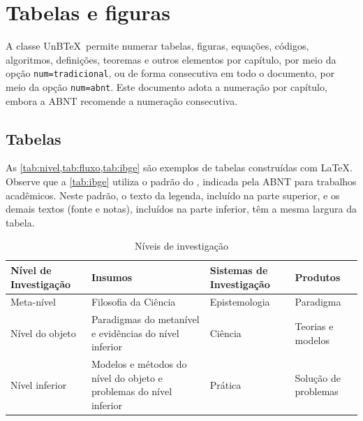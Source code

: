 \chapter{Tabelas e figuras}
\label{cap:tabfig}

A classe UnB\TeX\ permite numerar tabelas, figuras, equações, códigos, algoritmos, definições, teoremas e outros elementos por capítulo, por meio da opção \texttt{num=tradicional}, ou de forma consecutiva em todo o documento, por meio da opção \texttt{num=abnt}. Este documento adota a numeração por capítulo, embora a ABNT recomende a numeração consecutiva.

\section{Tabelas}

As \cref{tab:nivel,tab:fluxo,tab:ibge} são exemplos de tabelas construídas com \LaTeX. Observe que a \cref{tab:ibge} utiliza o padrão do , indicada pela ABNT para trabalhos acadêmicos. Neste padrão, o texto da legenda, incluído na parte superior, e os demais textos (fonte e notas), incluídos na parte inferior, têm a mesma largura da tabela.

\begin{table}[htb]
\centering
\small
\caption{Níveis de investigação}
\label{tab:nivel}
{\renewcommand{\arraystretch}{1.3}%
\begin{tabular}{p{2.6cm}p{5.5cm}p{2.8cm}p{2.5cm}}
  \rowcolor{verdeunb!10}\textbf{Nível de Investigação} & \textbf{Insumos} & \textbf{Sistemas de Investigação} & \textbf{Produtos} \\ \hline
  Meta-nível & Filosofia da Ciência & Epistemologia & Paradigma \\ \hline
  Nível do objeto & Paradigmas do metanível e evidências do nível inferior & Ciência  & Teorias e modelos \\ \hline
  Nível inferior & Modelos e métodos do nível do objeto e problemas do nível inferior & Prática & Solução de problemas \\
\end{tabular}}
\end{table}


